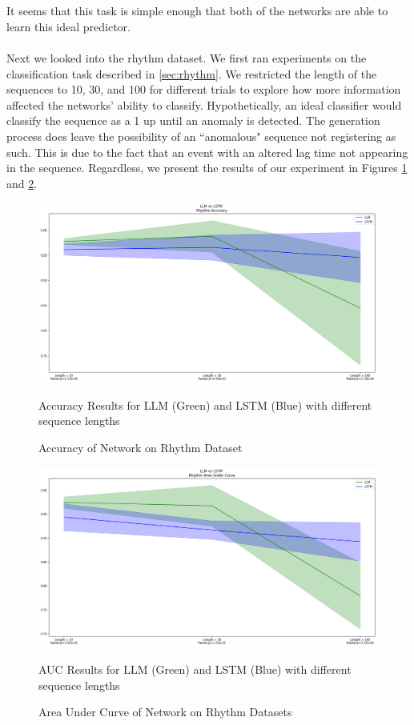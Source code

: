 \\\\ It seems that this task is simple enough that both of the networks are able to learn this ideal predictor.
\\\\  Next we looked into the rhythm dataset. We first ran experiments on the classification task described in \ref{sec:rhythm}. We restricted the length of the sequences to 10, 30, and 100 for different trials to explore how more information affected the networks' ability to classify. Hypothetically, an ideal classifier would classify the sequence as a 1 up until an anomaly is detected. The generation process does leave the possibility of an ``anomalous" sequence not registering as such. This is due to the fact that an event with an altered lag time not appearing in the sequence. Regardless, we present the results of our experiment in Figures \ref{fig:rhy_acc} and \ref{fig:rhy_auc}.
\begin{figure}
    \centering
    \includegraphics[width=1.0\textwidth]{figures/Rhythm_Accuracy.png}
    \caption{Accuracy of Network on Rhythm Dataset}
    \label{fig:rhy_acc}
    Accuracy Results for LLM (Green) and LSTM (Blue) with different sequence lengths
\end{figure}
\begin{figure}
    \centering
    \includegraphics[width=1.0\textwidth]{figures/Rhythm_AUC.png}
    \caption{Area Under Curve of Network on Rhythm Datasets}
    \label{fig:rhy_auc}
    AUC Results for LLM (Green) and LSTM (Blue) with different sequence lengths
\end{figure}

